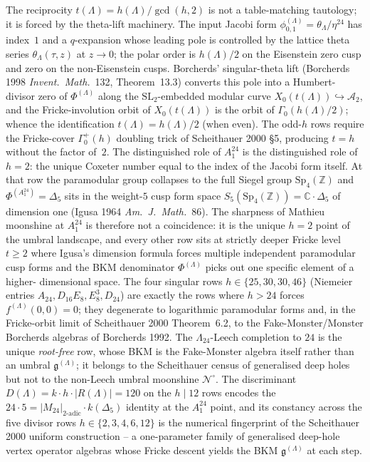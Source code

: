 \begin{remark}
\label{rem:k3ca-umbral-coxeter-level-first-principles}
The reciprocity $t(\Lambda)=h(\Lambda)/\gcd(h,2)$ is not a
table-matching tautology; it is forced by the theta-lift
machinery. The input Jacobi form
$\phi^{(\Lambda)}_{0,1}=\theta_\Lambda/\eta^{24}$ has index~$1$
and a $q$-expansion whose leading pole is controlled by the
lattice theta series $\theta_\Lambda(\tau,z)$ at
$z\to 0$; the polar order is $h(\Lambda)/2$ on the Eisenstein
zero cusp and zero on the non-Eisenstein cusps. Borcherds'
singular-theta lift (Borcherds 1998
\emph{Invent.~Math.}~132, Theorem~13.3) converts this pole into
a Humbert-divisor zero of $\Phi^{(\Lambda)}$ along the
$\mathrm{SL}_2$-embedded modular curve
$X_0(t(\Lambda))\hookrightarrow\mathcal A_2$, and the
Fricke-involution orbit of $X_0(t(\Lambda))$ is the orbit of
$\Gamma_0(h(\Lambda)/2)$; whence the identification
$t(\Lambda)=h(\Lambda)/2$ (when even). The odd-$h$ rows require
the Fricke-cover $\Gamma_0^+(h)$ doubling trick of Scheithauer
2000 \S5, producing $t=h$ without the factor of~$2$. The
distinguished role of $A_1^{24}$ is the distinguished role of
$h=2$: the unique Coxeter number equal to the index of the
Jacobi form itself. At that row the paramodular group
collapses to the full Siegel group $\mathrm{Sp}_4(\mathbb Z)$
and $\Phi^{(A_1^{24})}=\Delta_5$ sits in the weight-$5$ cusp
form space $S_5(\mathrm{Sp}_4(\mathbb Z))=\mathbb C\cdot\Delta_5$
of dimension one (Igusa 1964 \emph{Am.~J.~Math.}~86). The
sharpness of Mathieu moonshine at $A_1^{24}$ is therefore not a
coincidence: it is the unique $h=2$ point of the umbral landscape,
and every other row sits at strictly deeper Fricke level
$t\geq 2$ where Igusa's dimension formula forces multiple
independent paramodular cusp forms and the BKM denominator
$\Phi^{(\Lambda)}$ picks out one specific element of a higher-
dimensional space. The four singular rows
$h\in\{25,30,30,46\}$ (Niemeier entries
$A_{24},D_{16}E_8,E_8^3,D_{24}$) are exactly the rows where
$h>24$ forces $f^{(\Lambda)}(0,0)=0$; they degenerate to
logarithmic paramodular forms and, in the Fricke-orbit limit of
Scheithauer 2000 Theorem~6.2, to the Fake-Monster/Monster
Borcherds algebras of Borcherds 1992. The $\Lambda_{24}$-Leech
completion to $24$ is the unique \emph{root-free} row, whose BKM
is the Fake-Monster algebra itself rather than an umbral
$\mathfrak g^{(\Lambda)}$; it belongs to the Scheithauer census
of generalised deep holes but not to the non-Leech umbral
moonshine $\mathscr N^\circ$. The discriminant
$D(\Lambda)=k\cdot h\cdot|R(\Lambda)|=120$ on the $h\mid 12$
rows encodes the $24\cdot 5 = |M_{24}|_{2\text{-adic}}\cdot k(\Delta_5)$
identity at the $A_1^{24}$ point, and its constancy across the
five divisor rows $h\in\{2,3,4,6,12\}$ is the numerical
fingerprint of the Scheithauer 2000 uniform construction --
a one-parameter family of generalised deep-hole vertex operator
algebras whose Fricke descent yields the BKM $\mathfrak g^{(\Lambda)}$
at each step.
\end{remark}

